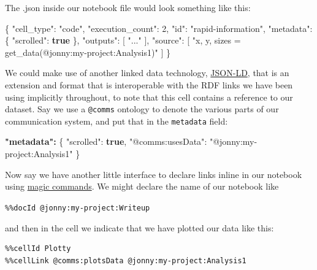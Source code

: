 \documentclass[notoc]{tufte-book}
\newenvironment{Shaded}{}{}
\newcommand{\DataTypeTok}[1]{\textcolor[rgb]{0.56,0.13,0.00}{#1}}
\newcommand{\DecValTok}[1]{\textcolor[rgb]{0.25,0.63,0.44}{#1}}
\newcommand{\ErrorTok}[1]{\textcolor[rgb]{1.00,0.00,0.00}{\textbf{#1}}}
\newcommand{\FunctionTok}[1]{\textcolor[rgb]{0.02,0.16,0.49}{#1}}
\newcommand{\KeywordTok}[1]{\textcolor[rgb]{0.00,0.44,0.13}{\textbf{#1}}}
\newcommand{\OtherTok}[1]{\textcolor[rgb]{0.00,0.44,0.13}{#1}}
\newcommand{\StringTok}[1]{\textcolor[rgb]{0.25,0.44,0.63}{#1}}
\begin{document}
The .json inside our notebook file would look something like this:

\begin{Shaded}
\begin{Highlighting}[]
\FunctionTok{\{}
   \DataTypeTok{"cell\_type"}\FunctionTok{:} \StringTok{"code"}\FunctionTok{,}
   \DataTypeTok{"execution\_count"}\FunctionTok{:} \DecValTok{2}\FunctionTok{,}
   \DataTypeTok{"id"}\FunctionTok{:} \StringTok{"rapid{-}information"}\FunctionTok{,}
   \DataTypeTok{"metadata"}\FunctionTok{:} \FunctionTok{\{}
    \DataTypeTok{"scrolled"}\FunctionTok{:} \KeywordTok{true}
   \FunctionTok{\},}
   \DataTypeTok{"outputs"}\FunctionTok{:} \OtherTok{[}
    \StringTok{"..."}
   \OtherTok{]}\FunctionTok{,}
   \DataTypeTok{"source"}\FunctionTok{:} \OtherTok{[}
    \StringTok{"x, y, sizes = get\_data(\textquotesingle{}@jonny:my{-}project:Analysis1\textquotesingle{})"}
   \OtherTok{]}
\FunctionTok{\}}
\end{Highlighting}
\end{Shaded}

We could make use of another linked data technology,
\href{https://json-ld.org/}{JSON-LD}, that is an extension and format
that is interoperable with the RDF links we have been using implicitly
throughout, to note that this cell contains a reference to our dataset.
Say we use a \texttt{@comms} ontology to denote the various parts of our
communication system, and put that in the \texttt{metadata} field:

\begin{Shaded}
\begin{Highlighting}[]
\ErrorTok{"metadata":} \FunctionTok{\{}
  \DataTypeTok{"scrolled"}\FunctionTok{:} \KeywordTok{true}\FunctionTok{,}
  \DataTypeTok{"@comms:usesData"}\FunctionTok{:} \StringTok{"@jonny:my{-}project:Analysis1"}
\FunctionTok{\}}
\end{Highlighting}
\end{Shaded}

Now say we have another little interface to declare links inline in our
notebook using
\href{https://ipython.readthedocs.io/en/stable/interactive/magics.html}{magic
commands}. We might declare the name of our notebook like

\texttt{\%\%docId\ @jonny:my-project:Writeup}

and then in the cell we indicate that we have plotted our data like
this:

\begin{verbatim}
%%cellId Plotty
%%cellLink @comms:plotsData @jonny:my-project:Analysis1
\end{verbatim}
\end{document}
